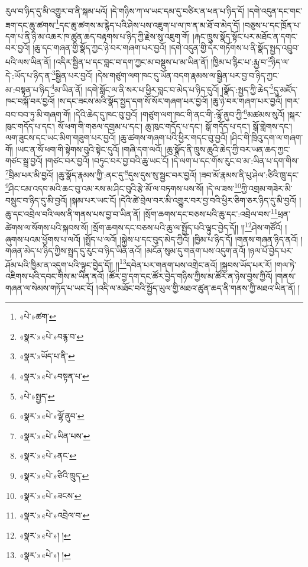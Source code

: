 རུལ་བ་ཉིད་དུ་མི་འགྱུར་བ་ནི་སྐམ་པའོ། །དེ་གཉིས་ཀ་ལ་ཡང་དམ་དུ་བཙིར་ན་ཕན་པ་ཉིད་དོ། །དགེ་འདུན་དང་གང་ཟག་དང་ཆུ་ཚགས་\footnote{«པེ་»ཚག་}དང་ཆུ་ཚགས་མ་རྙེད་པའི་ཤེས་པས་འཇུག་པ་ལ་ཁ་ན་མ་ཐོ་བ་མེད་དོ། །བཅུས་པ་དང་ཁྲོན་པ་དག་པ་ནི་ཉི་མ་འཆར་ཁ་ཚུན་ཆད་བརྟགས་པ་ཉིད་ཀྱི་རྗེས་སུ་འཇུག་གོ། །རྐང་ཁྲུས་སྣོད་སྟོང་པར་མཐོང་ན་དགང་བར་བྱའོ། །ཆུ་དང་གཞན་གྱི་སྣོད་ཀྱང་ཉེ་བར་གཞག་པར་བྱའོ། །དགེ་འདུན་གྱི་དེར་གཏོགས་པ་ནི་སྣོད་སྤྱད་འབྲུབ་པའི་ལས་ཡིན་ནོ། །འདིར་སྦྱིན་པ་དང་བླང་བ་དག་ཀྱང་མ་བསྡུས་པ་མ་ཡིན་ནོ། །ཁྱིམ་པ་རྙིང་པ་:རྨྱ་བ་\footnote{«སྣར་»«པེ་»བརྙ་བ་}ཉིད་ལ་དེ་:ཡོད་པ་ཉིད་ན་\footnote{«སྣར་»ཡོད་པ་ནི་}སྦྱིན་པར་བྱའོ། །དེས་གཙུག་ལག་ཁང་དུ་ཡོན་བདག་རྣམས་ལ་སྦྱིན་པར་བྱ་བ་ཉིད་ཀྱང་མ་:བསྟན་པ་ཉིད་\footnote{«སྣར་»«པེ་»བསྟན་པ་}མ་ཡིན་ནོ། །དགེ་སློང་ལ་ནི་སར་པ་ཕྱིར་བླང་བ་མེད་པ་ཉིད་དུའོ། །སྣོད་:སྤྱད་ཀྱི་ཆེད་\footnote{«པེ་»སྤྱད་}དུ་མཛོད་ཁང་བསྐོ་བར་བྱའོ། །ས་དང་ཟངས་མའི་སྣོད་སྤྱད་དག་སོ་སོར་གཞག་པར་བྱའོ། །ཆུ་ཉེ་བར་གཞག་པར་བྱའོ། །གར་བབ་བབ་ཏུ་མི་གཞག་གོ། །དེའི་ཆེད་དུ་ཁང་བུ་བྱའོ། །གཙུག་ལག་ཁང་གི་ནང་གི་:ལྷོ་ནུབ་ཀྱི་\footnote{«སྣར་»«པེ་»ལྷོ་ནུབ་}མཚམས་སུའོ། །སྐར་ཁུང་གདོད་པ་དང་། སོ་ཕག་གི་གཅལ་དགྲམ་པ་དང་། ཆུ་ཁུང་གདོད་པ་དང་། སྒོ་གདོད་པ་དང་། སྒོ་གླེགས་དང་། ལག་ཟུངས་དང་ཡང་མིག་གཟུག་པར་བྱའོ། །ཆུ་ཚགས་གཞག་པའི་ཕྱིར་གདང་བུ་བྱའོ། །ཤིང་གི་ཁྲིའུ་དག་ལ་གཞག་གོ། །ཡང་ན་སོ་ཕག་གི་སྟེགས་བུའི་སྟེང་དུའོ། །གཞི་དག་ལའོ། །ཆུ་སྣོད་ནི་ཁྲུས་ཆུའི་ཆེད་ཀྱི་བར་ཡན་ཆད་ཀྱང་གཙང་སྦྲ་བྱའོ། །གཙང་བར་བྱའོ། །བཏུང་བར་བྱ་བའི་ཆུ་ཡང་ངོ། །དེ་ལག་པ་དང་གོས་རུང་བ་མ་:ཡིན་པ་དག་གིས་\footnote{«སྣར་»«པེ་»ཡིན་པས་}བྲིམ་པར་མི་བྱའོ། །ཆུ་སྣོད་རྣམས་ཀྱི་:ནང་དུ་\footnote{«སྣར་»«པེ་»ནང་}དུས་དུས་སུ་སྦྱང་བར་བྱའོ། །ཟབ་མོ་རྣམས་ནི་པུ་ཤེལ་:ཙིའི་ཁྲུ་དང་\footnote{«སྣར་»«པེ་»ཙིའི་ཁྲུད་}ཤིང་ངམ་འདབ་མའི་ཆང་བུ་འམ་རས་མ་ཤིང་བུའི་རྩེ་མོ་ལ་བཏགས་པས་སོ། །དེ་ལ་ཟས་\footnote{«སྣར་»«པེ་»ཟངས་}ཀྱི་འགྲམ་གཟེར་མི་བསྲུང་བ་ཉིད་དུ་མི་བྱའོ། །སྐམ་པར་ཡང་ངོ། །དེའི་ཚེ་བྲེལ་བར་མི་འགྱུར་བར་བྱ་བའི་ཕྱིར་ཅིག་ཅར་ཉིད་དུ་མི་བྱའོ། །ཆུ་དང་འབྲེལ་བའི་ལས་ནི་གནས་པས་བྱ་བ་ཡིན་ནོ། །སྲོག་ཆགས་དང་བཅས་པའི་ཆུ་དང་:འབྲེལ་བས་\footnote{«སྣར་»«པེ་»འབྲེལ་བ་}ཕྲན་ཚེགས་ལ་སོགས་པའི་སྐབས་སོ། །སྲོག་ཆགས་དང་བཅས་པའི་ཆུ་ལ་སྤྱོད་པའི་ལྟུང་བྱེད་དོ།། །།\footnote{«སྣར་»«པེ་»། །}ཤེས་གཙོའོ། །ཞུགས་པའམ་ཕྱོགས་པ་ལའོ། །སྤྲོད་པ་ལའོ། །སྐྱེས་པ་དང་བུད་མེད་ཀྱིའོ། །ཁྱིམ་པ་ཉིད་དོ། །གནས་གཞན་ཉིད་ནའོ། །གཞན་མེད་པ་ཉིད་ཀྱིས་སྤྲད་དུ་རུང་བ་ཉིད་ཡིན་ནའོ། །མངོན་སུམ་དུ་གནག་པས་འདུག་ནའོ། །ཉལ་པོ་བྱེད་པར་ཤོམ་པའི་ཁྱིམ་ན་འདུག་པའི་ལྟུང་བྱེད་དོ།། །།\footnote{«སྣར་»«པེ་»། །}དབེན་པར་གནག་པས་འགྲེང་ནའོ། །སྐྱབས་ཡོད་པར་རོ། །གལ་ཏེ་འཇིགས་པའི་དབང་གིས་མ་ཡིན་ནའོ། །ཚོར་བྱ་དག་དང་ཚོར་བྱེད་གཉིས་ཀྱིས་མ་ཚོར་ན་ཉེས་བྱས་ཀྱིའོ། །གནས་གཞན་ལ་སེམས་གཏོད་པ་ཡང་ངོ། །འདི་ལ་མཐོང་བའི་སྤྱོད་ཡུལ་གྱི་མཐའ་ཚུན་ཆད་ནི་གནས་ཀྱི་མཐའ་ཡིན་ནོ། །
